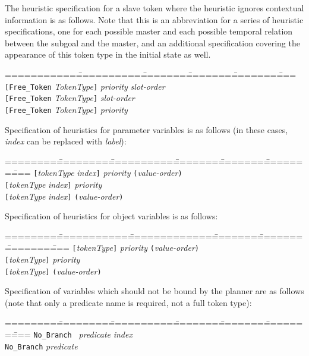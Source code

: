 The heuristic specification for a slave token where the heuristic
ignores contextual information is as follows.  Note that this is an
abbreviation for a series of heuristic specifications, one for each
possible master and each possible temporal relation between the
subgoal and the master, and an additional specification covering the
appearance of this token type in the initial state as well.

\begin{tabbing}
===========\===========\========\========\========\====\kill
{\tt [Free\_Token} \>    {\em TokenType}{\tt]} \> {\em priority} \> {\em slot-order}\\
{\tt [Free\_Token} \>    {\em TokenType}{\tt]} \> {\em slot-order}\\
{\tt [Free\_Token} \>    {\em TokenType}{\tt]} \> {\em priority}\\
\end{tabbing}


Specification of heuristics for parameter variables is as follows (in these cases,
{\em index} can be replaced with {\em label}):

\begin{tabbing}
========\=========\===========\========\========\========\====\kill
{\tt[}{\em tokenType} \> {\em index}{\tt]} \> {\em priority} \> {\tt(}{\em value-order}{\tt)}\\
{\tt[}{\em tokenType} \> {\em index}{\tt]} \> {\em priority} \\
{\tt[}{\em tokenType} \> {\em index}{\tt]} \> {\tt(}{\em value-order}{\tt)}\\
\end{tabbing}

Specification of heuristics for object variables is as follows:

\begin{tabbing}
========\============\==============\========\========\========\====\kill
{\tt[}{\em tokenType}{\tt]} \> {\em priority} \> {\tt(}{\em value-order}{\tt)}\\
{\tt[}{\em tokenType}{\tt]} \> {\em priority} \\
{\tt[}{\em tokenType}{\tt]} \> {\tt(}{\em value-order}{\tt)}\\
\end{tabbing}

Specification of variables which should not be bound by the planner are as follows
(note that only a predicate name is required, not a full token type):
\begin{tabbing}
========\=========\===========\========\========\========\====\kill
{\tt No\_Branch }\> {\em predicate} \> {\em index}\\
{\tt No\_Branch}\> {\em predicate}\\
\end{tabbing}


